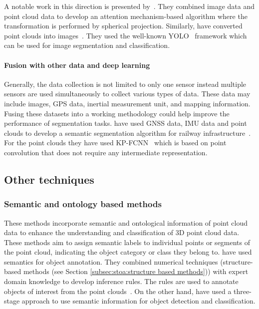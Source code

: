 A notable work in this direction is presented by~\cite{wang2022farnet}. They combined image data and point cloud data to develop an attention mechanism-based algorithm where the transformation is performed by spherical projection. 
Similarly, \citeauthor{wolf2021asset} have converted point clouds into images~\cite{wolf2021asset}. They used the well-known YOLO~\cite{yolov3} framework which can be used for image segmentation and classification.
 
\paragraph{Fusion with other data and deep learning}
Generally, the data collection is not limited to only one sensor instead multiple sensors are used simultaneously to collect various types of data. These data may include images, GPS data, inertial measurement unit, and mapping information. Fusing these datasets into a working methodology could help improve the performance of segmentation tasks. 
\citeauthor{mathani2022enhancing} have used GNSS data, IMU data and point clouds to develop a semantic segmentation algorithm for railway infrastructure~\cite{mathani2022enhancing}. For the point clouds they have used KP-FCNN~\cite{thomas2019KPConv} which is based on point convolution that does not require any intermediate representation. 

\subsection{Other techniques}
\subsubsection{Semantic and ontology based methods}
These methods incorporate semantic and ontological information of point cloud data to enhance the understanding and classification of 3D point cloud data. These methods aim to assign semantic labels to individual points or segments of the point cloud, indicating the object category or class they belong to. 
\citeauthor{karmacharya2015knowledge} have used semantics for object annotation. They combined numerical techniques (structure-based methods (see Section \ref{subsec:stoa:structure based methods})) with expert domain knowledge to develop inference rules. The rules are used to annotate objects of interest from the point clouds~\cite{karmacharya2015knowledge}.   
On the other hand, \cite{truong2013automatic} have used a three-stage approach to use semantic information for object detection and classification. 

